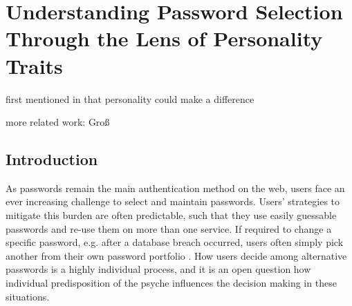 \chapter[Studies on Password Selection and Personality Traits]{Understanding Password Selection Through the Lens of Personality Traits}\label{chap:pws_and_personality}

first mentioned in \cite{Weirich2001PrettyGoodPersuasion} that personality could make a difference

more related work: Groß \etal \cite{Gross2016CognitiveDepletion}

\section{Introduction}


As passwords remain the main authentication method on the web, users face an ever increasing challenge to select and maintain passwords. Users' strategies to mitigate this burden are often predictable, such that they use easily guessable passwords and re-use them on more than one service. If required to change a specific password, e.g. after a database breach occurred, users often simply pick another from their own password portfolio \cite{Bonneau2015ImperfectAuthentication, Florencio2014PasswordPortfoliosFiniteUser, Stobert2014PasswordLifeCycle}. How users decide among alternative passwords is a highly individual process, and it is an open question how individual predisposition of the psyche influences the decision making in these situations.


